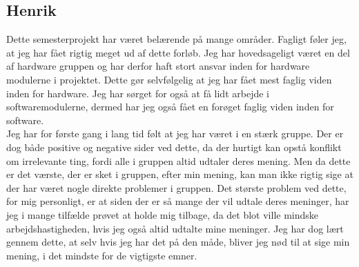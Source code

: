 \subsection{Henrik}
Dette semesterprojekt har været belærende på mange områder. Fagligt føler jeg, at jeg har fået rigtig meget ud af dette forløb. Jeg har hovedsageligt været en del af hardware gruppen og har derfor haft stort ansvar inden for hardware modulerne i projektet. Dette gør selvfølgelig at jeg har fået mest faglig viden inden for hardware. Jeg har sørget for også at få lidt arbejde i softwaremodulerne, dermed har jeg også fået en forøget faglig viden inden for software.\\
Jeg har for første gang i lang tid følt at jeg har været i en stærk gruppe. Der er dog både positive og negative sider ved dette, da der hurtigt kan opstå konflikt om irrelevante ting, fordi alle i gruppen altid udtaler deres mening. Men da dette er det værste, der er sket i gruppen, efter min mening, kan man ikke rigtig sige at der har været nogle direkte problemer i gruppen. Det største problem ved dette, for mig personligt, er at siden der er så mange der vil udtale deres meninger, har jeg i mange tilfælde prøvet at holde mig tilbage, da det blot ville mindske arbejdshastigheden, hvis jeg også altid udtalte mine meninger. Jeg har dog lært gennem dette, at selv hvis jeg har det på den måde, bliver jeg nød til at sige min mening, i det mindste for de vigtigste emner.